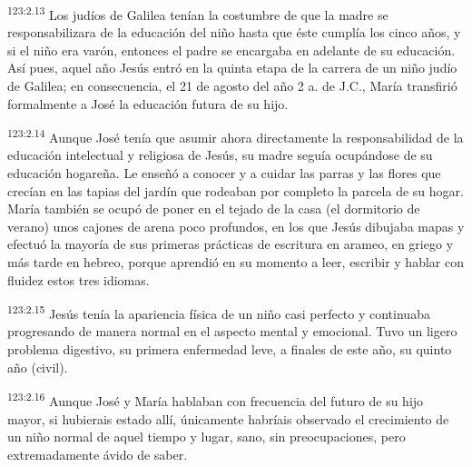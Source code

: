 \par 
\textsuperscript{123:2.13} Los judíos de Galilea tenían la costumbre de que la madre se responsabilizara de la educación del niño hasta que éste cumplía los cinco años, y si el niño era varón, entonces el padre se encargaba en adelante de su educación. Así pues, aquel año Jesús entró en la quinta etapa de la carrera de un niño judío de Galilea; en consecuencia, el 21 de agosto del año 2 a. de J.C., María transfirió formalmente a José la educación futura de su hijo.

\par 
\textsuperscript{123:2.14} Aunque José tenía que asumir ahora directamente la responsabilidad de la educación intelectual y religiosa de Jesús, su madre seguía ocupándose de su educación hogareña. Le enseñó a conocer y a cuidar las parras y las flores que crecían en las tapias del jardín que rodeaban por completo la parcela de su hogar. María también se ocupó de poner en el tejado de la casa (el dormitorio de verano) unos cajones de arena poco profundos, en los que Jesús dibujaba mapas y efectuó la mayoría de sus primeras prácticas de escritura en arameo, en griego y más tarde en hebreo, porque aprendió en su momento a leer, escribir y hablar con fluidez estos tres idiomas.

\par 
\textsuperscript{123:2.15} Jesús tenía la apariencia física de un niño casi perfecto y continuaba progresando de manera normal en el aspecto mental y emocional. Tuvo un ligero problema digestivo, su primera enfermedad leve, a finales de este año, su quinto año (civil).

\par 
\textsuperscript{123:2.16} Aunque José y María hablaban con frecuencia del futuro de su hijo mayor, si hubierais estado allí, únicamente habríais observado el crecimiento de un niño normal de aquel tiempo y lugar, sano, sin preocupaciones, pero extremadamente ávido de saber.

